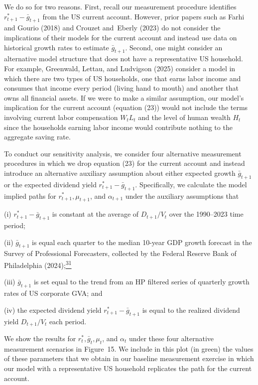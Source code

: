 \documentclass[11pt]{article}
\begin{document}
We do so for two reasons. First, recall our measurement procedure identifies $r_{t+1}^{*}-\bar{g}_{t+1}$ from the US current account. However, prior papers such as Farhi and Gourio (2018) and Crouzet and Eberly (2023) do not consider the implications of their models for the current account and instead use data on historical growth rates to estimate $\bar{g}_{t+1}$. Second, one might consider an alternative model structure that does not have a representative US household. For example, Greenwald, Lettau, and Ludvigson (2025) consider a model in which there are two types of US households, one that earns labor income and consumes that income every period (living hand to mouth) and another that owns all financial assets. If we were to make a similar assumption, our model’s implication for the current account (equation (23)) would not include the terms involving current labor compensation $W_{t}L_{t}$ and the level of human wealth $H_{t}$ since the households earning labor income would contribute nothing to the aggregate saving rate.


To conduct our sensitivity analysis, we consider four alternative measurement procedures in which we drop equation (23) for the current account and instead introduce an alternative auxiliary assumption about either expected growth $\bar{g}_{t+1}$ or the expected dividend yield $r_{t+1}^{*}-\bar{g}_{t+1}$. Specifically, we calculate the model implied paths for $r_{t+1}^{*},\mu _{t+1}$, and $\alpha _{t+1}$ under the auxiliary assumptions that


(i) $r_{t+1}^{*}-\bar{g}_{t+1}$ is constant at the average of $D_{t+1}/V_{t}$ over the 1990–2023 time period;


(ii) $\bar{g}_{t+1}$ is equal each quarter to the median 10-year GDP growth forecast in the Survey of Professional Forecasters, collected by the Federal Reserve Bank of Philadelphia (2024);\hyperlink{fn:31}{\textsuperscript{31}}


(iii) $\bar{g}_{t+1}$ is set equal to the trend from an HP filtered series of quarterly growth rates of US corporate GVA; and


(iv) the expected dividend yield $r_{t+1}^{*}-\bar{g}_{t+1}$ is equal to the realized dividend yield $D_{t+1}/V_{t}$ each period.


We show the results for $r_{t}^{*},\bar{g}_{t},\mu _{t}$, and $\alpha _{t}$ under these four alternative measurement scenarios in Figure 15. We include in this plot (in green) the values of these parameters that we obtain in our baseline measurement exercise in which our model with a representative US household replicates the path for the current account.
\end{document}
